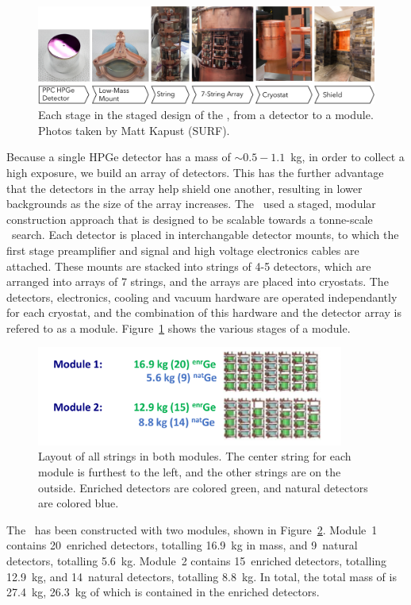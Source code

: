 \documentclass[/main.tex]{subfiles}
\begin{document}
\begin{figure}[h]
  \centering
  \includegraphics[width=\textwidth]{Modular_Design}
  \caption[Modular design of the \MJD]{\label{fig:modulardesign}
    Each stage in the staged design of the \MJD, from a detector to a module. Photos taken by Matt Kapust (SURF).
  }
\end{figure}
Because a single HPGe detector has a mass of $\sim0.5-1.1$~kg, in order to collect a high exposure, we build an array of detectors.
This has the further advantage that the detectors in the array help shield one another, resulting in lower backgrounds as the size of the array increases.
The \MJD\ used a staged, modular construction approach that is designed to be scalable towards a tonne-scale \znbb\ search.
Each detector is placed in interchangable detector mounts, to which the first stage preamplifier and signal and high voltage electronics cables are attached.
These mounts are stacked into strings of 4-5 detectors, which are arranged into arrays of 7 strings, and the arrays are placed into cryostats.
The detectors, electronics, cooling and vacuum  hardware are operated independantly for each cryostat, and the combination of this hardware and the detector array is refered to as a module.
Figure~\ref{fig:modulardesign} shows the various stages of a module.

\begin{figure}[h]
  \centering
  \includegraphics[width=0.9\textwidth]{modules}
  \caption[Layout of all strings in both modules with natural and enriched detectors labelled]{ \label{fig:modules}
    Layout of all strings in both modules. The center string for each module is furthest to the left, and the other strings are on the outside. Enriched detectors are colored green, and natural detectors are colored blue.
  }
\end{figure}
The \MJD\ has been constructed with two modules, shown in Figure~\ref{fig:modules}.
Module~1 contains 20~enriched detectors, totalling 16.9~kg in mass, and 9~natural detectors, totalling 5.6~kg.
Module~2 contains 15~enriched detectors, totalling 12.9~kg, and 14~natural detectors, totalling 8.8~kg.
In total, the total mass of  is 27.4~kg, 26.3~kg of which is contained in the enriched detectors.
\end{document}
